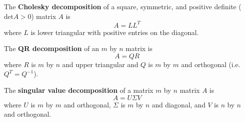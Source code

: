 \documentclass[compress]{beamer}
\renewcommand{\det}{\mathrm{det}}
\begin{document}
\begin{frame}  
  \begin{definition}
    The \textbf{Cholesky decomposition} of a square, symmetric, and
    positive definite ($\det A > 0$) matrix $A$ is
    \[ A = L L^T \] 
    where $L$ is lower triangular with positive entries on the
    diagonal. 
  \end{definition}
\end{frame}

\begin{frame}  
\begin{definition}
  The \textbf{QR decomposition} of an $m$ by $n$ matrix is 
  \[ A = QR \]
  where $R$ is $m$ by $n$ and upper triangular and $Q$ is $m$ by $m$
  and orthogonal (i.e.\ $Q^T = Q^{-1}$).
\end{definition}
\end{frame}

\begin{frame}  
\begin{definition}
  The \textbf{singular value decomposition} of a matrix $m$ by $n$
  matrix $A$ is
  \[ A = U \Sigma V \]
  where $U$ is $m$ by $m$ and orthogonal, $\Sigma$ is $m$ by $n$ and
  diagonal, and $V$ is $n$ by $n$ and orthogonal.
\end{definition}
\end{frame}
\end{document}
